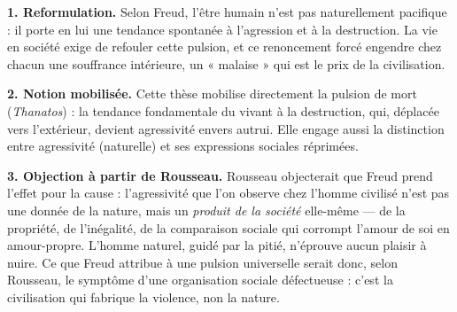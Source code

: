 \documentclass[11pt]{article}
\newcommand{\cle}[1]{{\popxbold\color{popdark}#1}}
\begin{document}
\begin{corrige}

\textbf{1. Reformulation.} Selon Freud, l'être humain n'est pas naturellement pacifique : il porte en lui une tendance spontanée à l'agression et à la destruction. La vie en société exige de refouler cette pulsion, et ce renoncement forcé engendre chez chacun une souffrance intérieure, un « malaise » qui est le prix de la civilisation.

\textbf{2. Notion mobilisée.} Cette thèse mobilise directement la \cle{pulsion de mort} (\emph{Thanatos}) : la tendance fondamentale du vivant à la destruction, qui, déplacée vers l'extérieur, devient agressivité envers autrui. Elle engage aussi la distinction entre \cle{agressivité} (naturelle) et ses expressions sociales réprimées.

\textbf{3. Objection à partir de Rousseau.} Rousseau objecterait que Freud prend l'effet pour la cause : l'agressivité que l'on observe chez l'homme civilisé n'est pas une donnée de la nature, mais un \emph{produit de la société} elle-même — de la propriété, de l'inégalité, de la comparaison sociale qui corrompt l'amour de soi en amour-propre. L'homme naturel, guidé par la pitié, n'éprouve aucun plaisir à nuire. Ce que Freud attribue à une pulsion universelle serait donc, selon Rousseau, le symptôme d'une organisation sociale défectueuse : c'est la civilisation qui fabrique la violence, non la nature.

\end{corrige}
\end{document}
